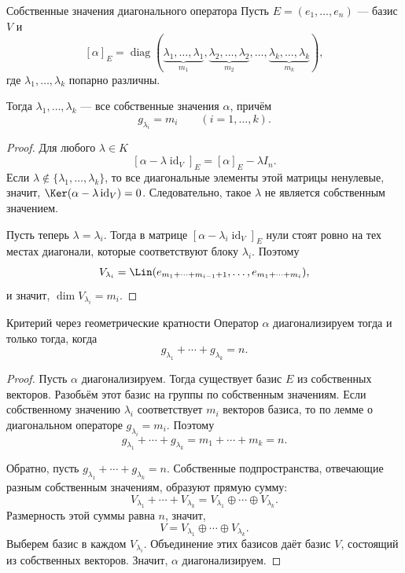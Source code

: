 \begin{Lemma}{Собственные значения диагонального оператора}{}
	Пусть $E=(e_1,\ldots,e_n)$ --- базис $V$ и
	\[
	[\alpha]_E=
	\operatorname{diag}(
	\underbrace{\lambda_1,\ldots,\lambda_1}_{m_1},
	\underbrace{\lambda_2,\ldots,\lambda_2}_{m_2},
	\ldots,
	\underbrace{\lambda_k,\ldots,\lambda_k}_{m_k}
	),
	\]
	где $\lambda_1,\ldots,\lambda_k$ попарно различны.
	
	Тогда $\lambda_1,\ldots,\lambda_k$ --- все собственные значения $\alpha$, причём
	\[
	g_{\lambda_i}=m_i
	\qquad
	(i=1,\ldots,k).
	\]
\end{Lemma}

\begin{proof}
	Для любого $\lambda\in K$
	\[
	[\alpha-\lambda\operatorname{id}_V]_E
	=
	[\alpha]_E-\lambda I_n.
	\]
	Если $\lambda\notin\{\lambda_1,\ldots,\lambda_k\}$, то все диагональные элементы этой матрицы ненулевые, значит,
	$\Ker(\alpha-\lambda\operatorname{id}_V)=0$.
	Следовательно, такое $\lambda$ не является собственным значением.
	
	Пусть теперь $\lambda=\lambda_i$.
	Тогда в матрице $[\alpha-\lambda_i\operatorname{id}_V]_E$ нули стоят ровно на тех местах диагонали, которые соответствуют блоку $\lambda_i$.
	Поэтому
	\[
	V_{\lambda_i}
	=
	\Lin(e_{m_1+\cdots+m_{i-1}+1},\ldots,e_{m_1+\cdots+m_i}),
	\]
	и значит, $\dim V_{\lambda_i}=m_i$.
\end{proof}


\begin{Theorem}{Критерий через геометрические кратности}{}
	Оператор $\alpha$ диагонализируем тогда и только тогда, когда
	\[
	g_{\lambda_1}+\cdots+g_{\lambda_k}=n.
	\]
\end{Theorem}

\begin{proof}
	Пусть $\alpha$ диагонализируем. Тогда существует базис $E$ из собственных векторов.
	Разобьём этот базис на группы по собственным значениям. Если собственному значению
	$\lambda_i$ соответствует $m_i$ векторов базиса, то по лемме о диагональном операторе
	$g_{\lambda_i}=m_i$. Поэтому
	\[
	g_{\lambda_1}+\cdots+g_{\lambda_k}
	=
	m_1+\cdots+m_k
	=
	n.
	\]
	
	Обратно, пусть
	$g_{\lambda_1}+\cdots+g_{\lambda_k}=n$.
	Собственные подпространства, отвечающие разным собственным значениям, образуют прямую сумму:
	\[
	V_{\lambda_1}+\cdots+V_{\lambda_k}
	=
	V_{\lambda_1}\oplus\cdots\oplus V_{\lambda_k}.
	\]
	Размерность этой суммы равна $n$, значит,
	\[
	V=V_{\lambda_1}\oplus\cdots\oplus V_{\lambda_k}.
	\]
	Выберем базис в каждом $V_{\lambda_i}$. Объединение этих базисов даёт базис $V$,
	состоящий из собственных векторов. Значит, $\alpha$ диагонализируем.
\end{proof}

